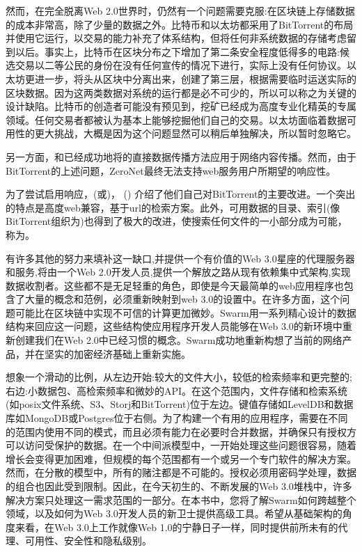 然而，在完全脱离Web 2.0世界时，仍然有一个问题需要克服:在区块链上存储数据的成本非常高，除了少量的数据之外。比特币和以太坊都采用了BitTorrent的布局并使用它运行，以交易的能力补充了体系结构，但将任何非系统数据的存储考虑留到以后。事实上，比特币在区块分布之下增加了第二条安全程度低得多的电路:候选交易以二等公民的身份在没有任何宣传的情况下进行，实际上没有任何协议。以太坊更进一步，将头从区块中分离出来，创建了第三层，根据需要临时运送实际的区块数据。因为这两类数据对系统的运行都是必不可少的，所以可以称之为关键的设计缺陷。比特币的创造者可能没有预见到，挖矿已经成为高度专业化精英的专属领域。任何交易者都被认为基本上能够挖掘他们自己的交易。以太坊面临着数据可用性的更大挑战，大概是因为这个问题显然可以稍后单独解决，所以暂时忽略它。 

另一方面，和\cite{zeronet}已经成功地将的直接数据传播方法应用于网络内容传播。然而，由于BitTorrent的上述问题，ZeroNet最终无法支持web服务用户所期望的响应性。

为了尝试启用响应，(或)，  () \cite{ipfs2014}介绍了他们自己对BitTorrent的主要改进。一个突出的特点是高度web兼容，基于url的检索方案。此外，可用数据的目录、索引(像BitTorrent组织为)也得到了极大的改进，使搜索任何文件的一小部分成为可能，称为。

有许多其他的努力来填补这一缺口,并提供一个有价值的Web 3.0星座的代理服务器和服务,将由一个Web 2.0开发人员,提供一个解放之路从现有依赖集中式架构,实现数据收割者。这些都不是无足轻重的角色，即使是今天最简单的web应用程序也包含了大量的概念和范例，必须重新映射到web 3.0的设置中。在许多方面，这个问题可能比在区块链中实现不可信的计算更加微妙。Swarm用一系列精心设计的数据结构来回应这一问题，这些结构使应用程序开发人员能够在Web 3.0的新环境中重新创建我们在Web 2.0中已经习惯的概念。Swarm成功地重新构想了当前的网络产品，并在坚实的加密经济基础上重新实施。

想象一个滑动的比例，从左边开始:较大的文件大小，较低的检索频率和更完整的;右边:小数据包、高检索频率和微妙的API。在这个范围内，文件存储和检索系统(如posix文件系统、S3、Storj和BitTorrent)位于左边。键值存储如LevelDB和数据库如MongoDB或Postgres位于右侧。为了构建一个有用的应用程序，需要在不同的范围内使用不同的模式，而且必须有能力在必要时合并数据，并确保只有授权方可以访问受保护的数据。在一个中间派模型中，一开始处理这些问题很容易，随着增长会变得更加困难，但规模的每个范围都有一个或另一个专门软件的解决方案。然而，在分散的模型中，所有的赌注都是不可能的。授权必须用密码学处理，数据的组合也因此受到限制。因此，在今天初生的、不断发展的Web 3.0堆栈中，许多解决方案只处理这一需求范围的一部分。在本书中，您将了解Swarm如何跨越整个领域，以及如何为Web 3.0开发人员的新卫士提供高级工具。希望从基础架构的角度来看，在Web 3.0上工作就像Web 1.0的宁静日子一样，同时提供前所未有的代理、可用性、安全性和隐私级别。

